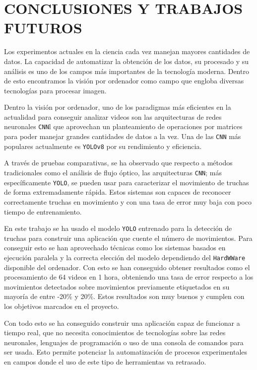 \section{CONCLUSIONES Y TRABAJOS FUTUROS}

Los experimentos actuales en la ciencia cada vez manejan mayores cantidades de datos. La capacidad de automatizar la obtención de los datos, su procesado y su análisis es uno de los campos más importantes 
de la tecnología moderna. Dentro de esto encontramos la visión por ordenador como campo que engloba diversas tecnologías para procesar imagen.

Dentro la visión por ordenador, uno de los paradigmas más eficientes en la actualidad para conseguir analizar videos son las arquitecturas de redes neuronales \texttt{CNN}l que aprovechan un planteamiento de 
operaciones por matrices para poder manejar grandes cantidades de datos a la vez. Una de las \texttt{CNN} más populares actualmente es \texttt{YOLOv8} por su rendimiento y eficiencia.

A través de pruebas comparativas, se ha observado que respecto a métodos tradicionales como el análisis de flujo óptico, las arquitecturas \texttt{CNN}; más específicamente \texttt{YOLO}, se pueden usar 
para caracterizar el movimiento de truchas de forma extremadamente rápida. Estos sistemas son capaces de reconocer correctamente truchas en movimiento y con una tasa de error muy baja con poco tiempo de entrenamiento.

En este trabajo se ha usado el modelo \texttt{YOLO} entrenado para la detección de truchas para construir una aplicación que cuente el número de movimientos. Para conseguir esto se han aprovechado técnicas como 
los sistemas basados en ejecución paralela y la correcta elección del modelo dependiendo del \texttt{HardWWare} disponible del ordenador. Con esto se han conseguido obtener resultados como el 
procesamiento de 64 videos en 1 hora, obteniendo una tasa de error respecto a los movimientos detectados sobre movimientos previamente etiquetados en su mayoría de entre -20\% y 20\%. \newline
Estos resultados son muy buenos y cumplen con los objetivos marcados en el proyecto.

Con todo esto se ha conseguido construir una aplicación capaz de funcionar a tiempo real, que no necesita conocimientos de tecnologías sobre las redes neuronales, lenguajes de programación o 
uso de una consola de comandos para ser usada. Esto permite potenciar la automatización de procesos experimentales en campos donde el uso de este tipo de herramientas va retrasado.

